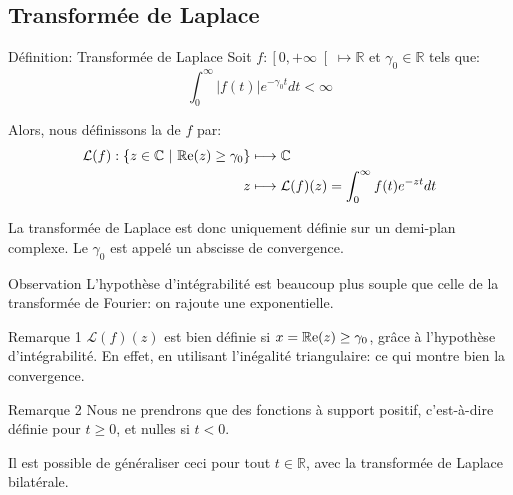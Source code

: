 \documentclass[a4paper]{article}
\begin{document}
\subsection{Transformée de Laplace}
\begin{parag}{Définition: Transformée de Laplace}
    Soit $f: \left[0, +\infty\right[ \mapsto \mathbb{R}$ et $\gamma_0 \in \mathbb{R}$ tels que: 
    \[\int_{0}^{\infty} \left|f\left(t\right)\right| e^{-\gamma_0 t} dt < \infty\]

    Alors, nous définissons la  de $f$ par:
    \[\begin{split}
    \mathcal{L}\left(f\right): \left\{z \in \mathbb{C} \suchthat \cre\left(z\right) \geq \gamma_0\right\} &\longmapsto \mathbb{C} \\
    z &\longmapsto \mathcal{L}\left(f\right)\left(z\right) = \int_{0}^{\infty} f\left(t\right) e^{-z t} dt
    \end{split}\]

    La transformée de Laplace est donc uniquement définie sur un demi-plan complexe. Le $\gamma_0$ est appelé un abscisse de convergence.

    \begin{subparag}{Observation}
        L'hypothèse d'intégrabilité est beaucoup plus souple que celle de la transformée de Fourier: on rajoute une exponentielle.
    \end{subparag}
    
    \begin{subparag}{Remarque 1}
        $\mathcal{L}\left(f\right)\left(z\right)$ est bien définie si $x = \cre\left(z\right) \geq \gamma_0$, grâce à l'hypothèse d'intégrabilité. En effet, en utilisant l'inégalité triangulaire: 
        ce qui montre bien la convergence.
    \end{subparag}

    \begin{subparag}{Remarque 2}
        Nous ne prendrons que des fonctions à support positif, c'est-à-dire définie pour $t \geq 0$, et nulles si $t < 0$.

        Il est possible de généraliser ceci pour tout $t \in \mathbb{R}$, avec la transformée de Laplace bilatérale.
    \end{subparag}
\end{parag}
\end{document}
